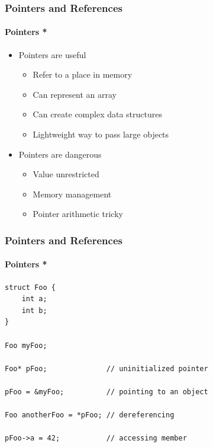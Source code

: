 \documentclass[table]{beamer}
\newcommand{\declarelesson}{\textbf{\color{themegreen}{Lesson:}} }
\begin{document}
\begin{frame}
    \frametitle{\declarelesson Pointers and References}
    \framesubtitle{Pointers *}
    \begin{itemize}
        \item Pointers are useful
            \begin{itemize}
                \item Refer to a place in memory
                \item Can represent an array
                \item Can create complex data structures
                \item Lightweight way to pass large objects
            \end{itemize}
        \item Pointers are dangerous
            \begin{itemize}
                \item Value unrestricted
                \item Memory management
                \item Pointer arithmetic tricky
            \end{itemize}
    \end{itemize}
\end{frame}

\begin{frame}[fragile]
    \frametitle{\declarelesson Pointers and References}
    \framesubtitle{Pointers *}
    \begin{lstlisting}[title=Pointer Usage]
struct Foo {
    int a;
    int b;
}

Foo myFoo;

Foo* pFoo;              // uninitialized pointer

pFoo = &myFoo;          // pointing to an object

Foo anotherFoo = *pFoo; // dereferencing

pFoo->a = 42;           // accessing member
    \end{lstlisting}
\end{frame}
\end{document}
